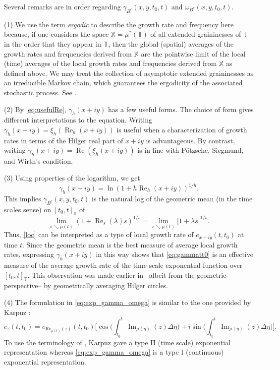 \documentclass[reqno]{amsart}
\DeclareMathOperator{\myRe}{Re}
\begin{document}
\begin{remark} \rm
Several remarks are in order regarding $\gamma_{B^c}(x,y,t_0,t)$ and
$\omega_{B^c}(x,y,t_0,t)$.

(1) We use the term \emph{ergodic} to describe the growth rate and frequency here
because, if one considers the space $\mathbb{X}=\mu^*(\mathbb{T})$ of all extended graininesses
of $\mathbb{T}$ \cite{JaDaE} in the order that they appear in $\mathbb{T}$, then the global (spatial)
averages of the growth rates and frequencies derived from $\mathbb{X}$ are the
pointwise limit of the local (time) averages of the local growth rates and frequencies
derived from $\mathbb{X}$ as defined above. We may treat the collection of asymptotic
extended graininesses as an irreducible Markov chain, which guarantees the ergodicity
of the associated stochastic process. See \cite{PoDaGr}.

(2) By \eqref{eq:usefulRe}, $\gamma_{h}(x+iy)$ has a few useful forms. The choice of
form gives different interpretations to the equation. Writing
$\gamma_{h}(x+iy) = \xi_{h}(\myRe_{h}(x+iy))$ is useful when a characterization of
growth rates in terms of the Hilger real part of $x+iy$ is advantageous.
By contrast, writing $\gamma_{h}(x+iy) = \myRe(\xi_{h}(x+iy))$ is in line with
P\"otzsche, Siegmund, and Wirth's condition.

(3) Using properties of the logarithm, we get
$$
\gamma_{h}(x+iy) = \ln(1+h \myRe_{h}(x+iy))^{1/h}.
$$
This implies $\gamma_{B^c}(x,y,t_0,t)$ is the natural log of the geometric mean (in
the time scales sense) on $[t_0,t]_\mathbb{T}$ of
\begin{equation}\label{loc}
 \lim_{s \searrow\mu(t)}(1+\operatorname{Re}_{s}(\lambda) s)^{1/s}
 = \lim_{s \searrow\mu(t)}|1+\lambda s|^{1/s}.
\end{equation}
Thus, \eqref{loc} can be interpreted as a type of local growth rate of $e_{x+iy}(t,t_0)$
at time $t$. Since the geometric mean is the best measure of average local growth rates,
expressing $\gamma_{h}(x+iy)$ in this way shows that \eqref{eq:gammatt0} is an effective
 measure of the average growth rate of the time scale exponential function over
$[t_0,t]_{\mathbb{T}}$. This observation was made earlier in \cite{DaGrMaJa,JaDaE} --albeit
from the geometric perspective-- by geometrically averaging Hilger circles.

(4) The formulation in \eqref{eq:exp_gamma_omega} is similar to the one provided by
 Karpuz \cite{Ka}:
 \[%
 e_{z}(t,t_0) = e_{\text{Re}_{\mu(t)}(z)}(t,t_0)
 \Big[ \cos\Big(\int_{t_0}^{t} \operatorname{Im}_{\mu(\eta)}(z) \Delta \eta\Big)
 + i \sin\Big(\int_{t_0}^{t} \operatorname{Im}_{\mu(\eta)}(z) \Delta \eta\Big) \Big].
 \]
To use the terminology of \cite{JaDalap}, Karpuz gave a type II (time scale)
exponential representation whereas \eqref{eq:exp_gamma_omega} is a type I (continuous)
exponential representation.


\end{remark}
\end{document}
